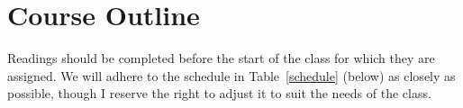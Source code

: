 \documentclass[titlepage]{article}
\begin{document}
\section{Course Outline}
\label{outline}

Readings should be completed before the start of the class for which
they are assigned. We will adhere to the schedule in
Table~\ref{schedule} (below) as closely as possible, though I reserve
the right to adjust it to suit the needs of the class.

\end{document}
